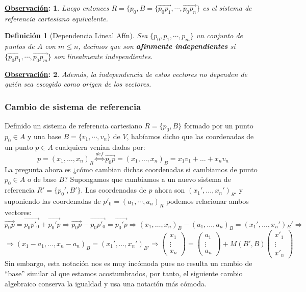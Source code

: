\documentclass[10pt,a4paper,openright]{book}
\theoremstyle{break}
\newtheorem*{defi}{Definición}
\newtheorem*{obs}{\underline{Observación}:}
\begin{document}
\begin{obs}
Luego entonces $R=\{p_0, B=\{\vec{p_0 p_1}, \cdots, \vec{p_0 p_n}\}$ es el sistema de referencia cartesiano equivalente.
\end{obs}

\begin{defi}[Dependencia Lineal Afín]
Sea $\{p_0, p_1, \cdots, p_m\}$ un conjunto de puntos de $A$ con $m \leq n$, decimos que son \textbf{afínmente independientes} si $\{\vec{p_0 p_1}, \cdots, \vec{p_0 p_m}\}$ son linealmente independientes.
\end{defi}

\begin{obs}
Además, la independencia de estos vectores no dependen de quién sea escogido como origen de los vectores.
\end{obs}

\subsubsection{Cambio de sistema de referencia}
Definido un sistema de referencia cartesiano $R = \{p_0, B\}$ formado por un punto $p_0 \in A$ y una base $B=\{v_1, \cdots, v_n\}$ de $V$, habíamos dicho que las coordenadas de un punto $p\in A$ cualquiera venían dadas por:
$$p=(x_1, \ldots, x_n)_R \overset{def}{\Leftrightarrow} \vec{p_0 p} = (x_1, \ldots, x_n)_B = x_1v_1 + \ldots + x_n v_n$$
La pregunta ahora es ¿cómo cambian dichas coordenadas si cambiamos de punto $p_0\in A$ o de base $B$? Supongamos que cambiamos a un nuevo sistema de referencia $R' = \{p_0', B'\}$. Las coordenadas de $p$ ahora son $(x_1', \ldots, x_n')_{R'}$ y suponiendo las coordenadas de  $p'_0=(a_1, \cdots , a_n)_R$ podemos relacionar ambos vectores:
$$\vec{p_0 p} = \vec{p_0 p'_0} + \vec{p_0' p} \Rightarrow  \vec{p_0 p} -\vec{p_0 p'_0}  =  \vec{p_0'p} \Rightarrow (x_1, \ldots, x_n)_B  -(a_1, \ldots, a_n)_B = (x_1', \ldots, x_n'){_B'} \Rightarrow $$
$$\Rightarrow (x_1 - a_1,  \ldots, x_n - a_n)_B = (x_1', \ldots, x_n')_{B'} \Rightarrow \begin{pmatrix}
x_1 \\ \vdots \\ x_n
\end{pmatrix} =\begin{pmatrix}
a_1 \\ \vdots \\ a_n
\end{pmatrix} + M(B',B)\begin{pmatrix}
x'_1 \\ \vdots \\ x'_n
\end{pmatrix} $$
Sin embargo, esta notación nos es muy incómoda pues no resulta un cambio de ``base'' similar al que estamos acostumbrados, por tanto, el siguiente cambio algebraico conserva la igualdad y usa una notación más cómoda.
\end{document}

